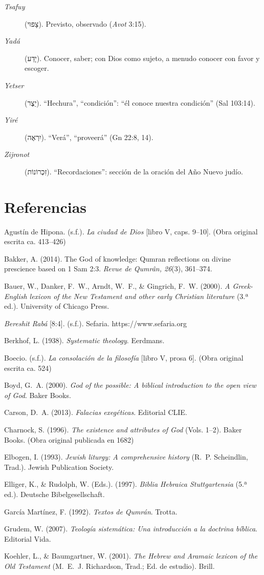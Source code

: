 \documentclass[11pt,letterpaper]{article}
\newcommand{\heb}[1]{\mbox{\foreignlanguage{hebrew}{#1}}}
\newcommand{\refapa}[1]{\par{\RaggedRight\hangindent=1.27cm\hangafter=1\noindent #1\par}\vspace{4pt}}
\begin{document}
\begin{description}
\item[\emph{Tsafuy}] (\heb{צָפוּי}). Previsto, observado (\emph{Avot} 3:15).
\item[\emph{Yadá}] (\heb{יָדַע}). Conocer, saber; con Dios como sujeto, a menudo conocer con favor y escoger.
\item[\emph{Yetser}] (\heb{יֵצֶר}). ``Hechura'', ``condición'': ``él conoce nuestra condición'' (Sal 103:14).
\item[\emph{Yiré}] (\heb{יִרְאֶה}). ``Verá'', ``proveerá'' (Gn 22:8, 14).
\item[\emph{Zijronot}] (\heb{זִכְרוֹנוֹת}). ``Recordaciones'': sección de la oración del Año Nuevo judío.
\end{description}

\section*{Referencias}
\refapa{Agustín de Hipona. (s.f.). \emph{La ciudad de Dios} [libro V, caps. 9--10]. (Obra original escrita ca. 413--426)}
\refapa{Bakker, A. (2014). The God of knowledge: Qumran reflections on divine prescience based on 1 Sam 2:3. \emph{Revue de Qumrân, 26}(3), 361--374.}
\refapa{Bauer, W., Danker, F.~W., Arndt, W.~F., \& Gingrich, F.~W. (2000). \emph{A Greek-English lexicon of the New Testament and other early Christian literature} (3.ª ed.). University of Chicago Press.}
\refapa{\emph{Bereshit Rabá} [8:4]. (s.f.). Sefaria. https://www.sefaria.org}
\refapa{Berkhof, L. (1938). \emph{Systematic theology}. Eerdmans.}
\refapa{Boecio. (s.f.). \emph{La consolación de la filosofía} [libro V, prosa 6]. (Obra original escrita ca. 524)}
\refapa{Boyd, G.~A. (2000). \emph{God of the possible: A biblical introduction to the open view of God}. Baker Books.}
\refapa{Carson, D.~A. (2013). \emph{Falacias exegéticas}. Editorial CLIE.}
\refapa{Charnock, S. (1996). \emph{The existence and attributes of God} (Vols. 1--2). Baker Books. (Obra original publicada en 1682)}
\refapa{Elbogen, I. (1993). \emph{Jewish liturgy: A comprehensive history} (R.~P. Scheindlin, Trad.). Jewish Publication Society.}
\refapa{Elliger, K., \& Rudolph, W. (Eds.). (1997). \emph{Biblia Hebraica Stuttgartensia} (5.ª ed.). Deutsche Bibelgesellschaft.}
\refapa{García Martínez, F. (1992). \emph{Textos de Qumrán}. Trotta.}
\refapa{Grudem, W. (2007). \emph{Teología sistemática: Una introducción a la doctrina bíblica}. Editorial Vida.}
\refapa{Koehler, L., \& Baumgartner, W. (2001). \emph{The Hebrew and Aramaic lexicon of the Old Testament} (M.~E.~J. Richardson, Trad.; Ed. de estudio). Brill.}
\end{document}
